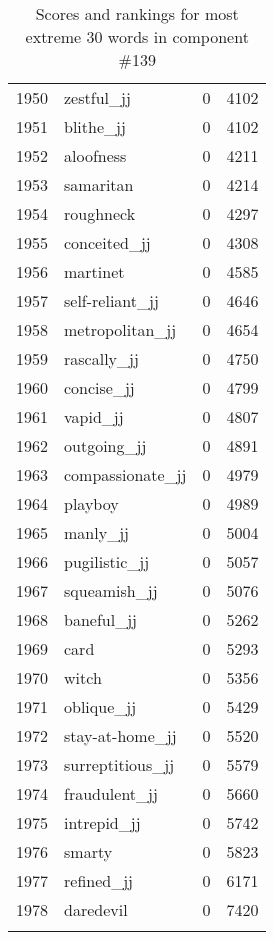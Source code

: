 \begin{longtable}[!htbp]{| rlr@{.}l |}
    1950 & zestful\_jj & 0 & 4102 \\
    1951 & blithe\_jj & 0 & 4102 \\
    1952 & aloofness & 0 & 4211 \\
    1953 & samaritan & 0 & 4214 \\
    1954 & roughneck & 0 & 4297 \\
    1955 & conceited\_jj & 0 & 4308 \\
    1956 & martinet & 0 & 4585 \\
    1957 & self-reliant\_jj & 0 & 4646 \\
    1958 & metropolitan\_jj & 0 & 4654 \\
    1959 & rascally\_jj & 0 & 4750 \\
    1960 & concise\_jj & 0 & 4799 \\
    1961 & vapid\_jj & 0 & 4807 \\
    1962 & outgoing\_jj & 0 & 4891 \\
    1963 & compassionate\_jj & 0 & 4979 \\
    1964 & playboy & 0 & 4989 \\
    1965 & manly\_jj & 0 & 5004 \\
    1966 & pugilistic\_jj & 0 & 5057 \\
    1967 & squeamish\_jj & 0 & 5076 \\
    1968 & baneful\_jj & 0 & 5262 \\
    1969 & card & 0 & 5293 \\
    1970 & witch & 0 & 5356 \\
    1971 & oblique\_jj & 0 & 5429 \\
    1972 & stay-at-home\_jj & 0 & 5520 \\
    1973 & surreptitious\_jj & 0 & 5579 \\
    1974 & fraudulent\_jj & 0 & 5660 \\
    1975 & intrepid\_jj & 0 & 5742 \\
    1976 & smarty & 0 & 5823 \\
    1977 & refined\_jj & 0 & 6171 \\
    1978 & daredevil & 0 & 7420 \\
    \hline
    \caption{Scores and rankings for most extreme 30 words in component \#139} \\
\end{longtable}
